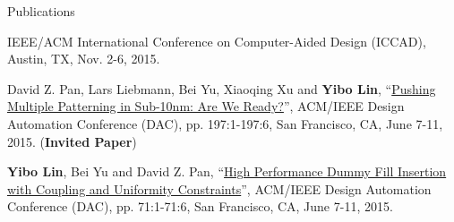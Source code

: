 \begin{rSection}{Publications}
\begin{description}[font=\normalfont]
{    IEEE/ACM International Conference on Computer-Aided Design (ICCAD), Austin, TX, Nov. 2-6, 2015.
}
\item[{[C2]}]{
 David Z. Pan, Lars Liebmann, Bei Yu, Xiaoqing Xu and \textbf{Yibo Lin}, 
 ``\href{http://dl.acm.org/citation.cfm?id=2744769.2747940}{Pushing Multiple Patterning in Sub-10nm: Are We Ready?}'', 
    ACM/IEEE Design Automation Conference (DAC), pp. 197:1-197:6, San Francisco, CA, June 7-11, 2015. 
    (\textbf{Invited Paper})
}
\item[{[C1]}]{
 \textbf{Yibo Lin}, Bei Yu and David Z. Pan, 
 ``\href{http://dl.acm.org/citation.cfm?id=2744769.2744850}{High Performance Dummy Fill Insertion with Coupling and Uniformity Constraints}'',
    ACM/IEEE Design Automation Conference (DAC), pp. 71:1-71:6, San Francisco, CA, June 7-11, 2015. 
}
\end{description}


\end{rSection}


